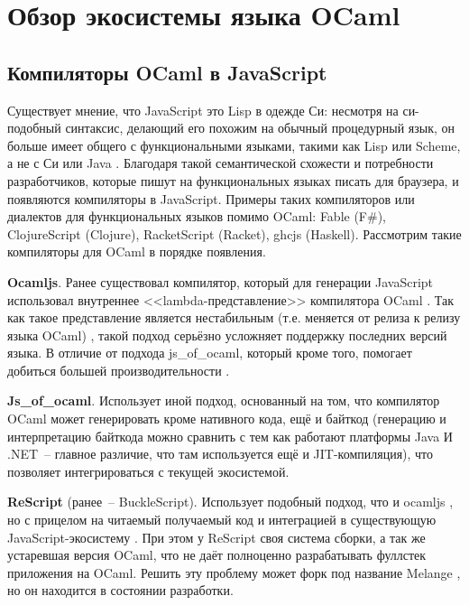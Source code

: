 \section{Обзор экосистемы языка OCaml}

\TODO

\subsection{Компиляторы OCaml в JavaScript}\label{jsoo}

Существует мнение, что JavaScript это Lisp в одежде Си:
несмотря на си-подобный синтаксис, делающий его похожим на обычный процедурный язык,
он больше имеет общего с функциональными языками, такими как Lisp или Scheme,
а не с Си или Java \cite{crockford}. Благодаря такой семантической схожести и
потребности разработчиков, которые пишут на функциональных языках писать для браузера,
и появляются компиляторы в JavaScript. Примеры таких компиляторов или диалектов для функциональных языков помимо OCaml:
Fable (F\#), ClojureScript (Clojure), RacketScript (Racket), ghcjs (Haskell).
Рассмотрим такие компиляторы для OCaml в порядке появления.

\textbf{Ocamljs}. Ранее существовал компилятор, который для генерации JavaScript
использовал внутреннее <<lambda-представление>> компилятора OCaml \cite{ocamljs-lambda}.
Так как такое представление является нестабильным (т.е. меняется от релиза к релизу языка OCaml) \cite{rwo-backend},
такой подход серьёзно усложняет поддержку последних версий языка. В отличие от подхода js\_of\_ocaml,
который кроме того,
помогает добиться большей производительности \cite[с.~13]{vouillon-jsoo}.

\textbf{Js\_of\_ocaml}. Использует иной подход, основанный на том, что компилятор OCaml
может генерировать кроме нативного кода, ещё и байткод
(генерацию и интерпретацию байткода можно сравнить с тем как работают платформы Java И .NET~--
главное различие, что там используется ещё и JIT-компиляция), что позволяет
интегрироваться с текущей экосистемой\cite[с.~1]{vouillon-jsoo}.

\textbf{ReScript} (ранее~-- BuckleScript). Использует подобный подход, что и ocamljs \cite{bobzhang-rawlambda},
но с прицелом на читаемый получаемый код и интеграцией в существующую JavaScript-экосистему \cite{rescript-introduction}.
При этом у ReScript своя система сборки, а так же устаревшая версия OCaml, что не даёт полноценно
разрабатывать фуллстек приложения на OCaml. Решить эту проблему может форк под название Melange \cite{melange},
но он находится в состоянии разработки.


